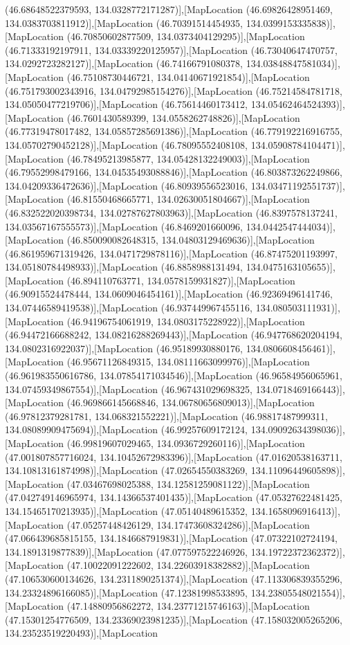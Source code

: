 (46.68648522379593, 134.0328772171287)],[MapLocation (46.69826428951469, 134.0383703811912)],[MapLocation (46.70391514454935, 134.0399153335838)],[MapLocation (46.70850602877509, 134.0373404129295)],[MapLocation (46.71333192197911, 134.03339220125957)],[MapLocation (46.73040647470757, 134.0292723282127)],[MapLocation (46.74166791080378, 134.03848847581034)],[MapLocation (46.75108730446721, 134.04140671921854)],[MapLocation (46.751793002343916, 134.04792985154276)],[MapLocation (46.75214584781718, 134.05050477219706)],[MapLocation (46.75614460173412, 134.05462464524393)],[MapLocation (46.7601430589399, 134.0558262748826)],[MapLocation (46.77319478017482, 134.05857285691386)],[MapLocation (46.779192216916755, 134.05702790452128)],[MapLocation (46.78095552408108, 134.05908784104471)],[MapLocation (46.78495213985877, 134.05428132249003)],[MapLocation (46.79552998479166, 134.04535493088846)],[MapLocation (46.803873262249866, 134.04209336472636)],[MapLocation (46.80939556523016, 134.03471192551737)],[MapLocation (46.81550468665771, 134.02630051804667)],[MapLocation (46.832522020398734, 134.02787627803963)],[MapLocation (46.8397578137241, 134.03567167555573)],[MapLocation (46.8469201660096, 134.0442547444034)],[MapLocation (46.850090082648315, 134.04803129469636)],[MapLocation (46.861959671319426, 134.0471729878116)],[MapLocation (46.87475201193997, 134.05180784498933)],[MapLocation (46.8858988131494, 134.0475163105655)],[MapLocation (46.894110763771, 134.0578159931827)],[MapLocation (46.90915524478444, 134.0609046454161)],[MapLocation (46.92369496141746, 134.07446589419538)],[MapLocation (46.937449967455116, 134.080503111931)],[MapLocation (46.94196754061919, 134.0803175228922)],[MapLocation (46.94472166688242, 134.08216288269443)],[MapLocation (46.947768620204194, 134.0802316922037)],[MapLocation (46.95189930880176, 134.0806608456461)],[MapLocation (46.95671126849315, 134.08111663099976)],[MapLocation (46.961983550616786, 134.07854171034546)],[MapLocation (46.96584956065961, 134.07459349867554)],[MapLocation (46.967431029698325, 134.0718469166443)],[MapLocation (46.969866145668846, 134.06780656809013)],[MapLocation (46.97812379281781, 134.068321552221)],[MapLocation (46.98817487999311, 134.08089909475694)],[MapLocation (46.99257609172124, 134.09092634398036)],[MapLocation (46.99819607029465, 134.0936729260116)],[MapLocation (47.001807857716024, 134.10452672983396)],[MapLocation (47.01620538163711, 134.10813161874998)],[MapLocation (47.02654550383269, 134.11096449605898)],[MapLocation (47.03467698025388, 134.12581259081122)],[MapLocation (47.042749146965974, 134.14366537401435)],[MapLocation (47.05327622481425, 134.15465170213935)],[MapLocation (47.05140489615352, 134.1658096916413)],[MapLocation (47.05257448426129, 134.17473608324286)],[MapLocation (47.066439685815155, 134.1846687919831)],[MapLocation (47.07322102724194, 134.1891319877839)],[MapLocation (47.077597522246926, 134.19722372362372)],[MapLocation (47.10022091222602, 134.22603918382882)],[MapLocation (47.106530600134626, 134.2311890251374)],[MapLocation (47.113306839355296, 134.23324896166085)],[MapLocation (47.12381998533895, 134.23805548021554)],[MapLocation (47.14880956862272, 134.23771215746163)],[MapLocation (47.15301254776509, 134.23369023981235)],[MapLocation (47.158032005265206, 134.23523519220493)],[MapLocation 